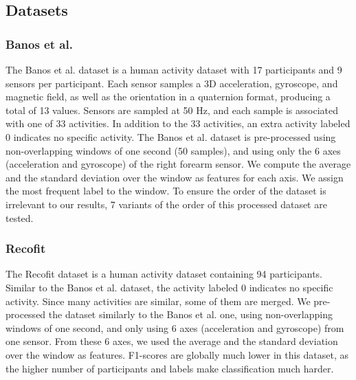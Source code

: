 \documentclass[conference]{IEEEtran}
\begin{document}
\subsection{Datasets}
\subsubsection{Banos et al.}
The Banos et al. dataset \cite{banos2012benchmark,banos2014dealing} is a human activity dataset with 17 participants and 9 sensors per participant. Each sensor samples a 3D acceleration, gyroscope, and magnetic field, as well as the orientation in a quaternion format, producing a total of 13 values. Sensors are sampled at 50 Hz, and each sample is associated with one of 33 activities. In addition to the 33 activities, an extra activity labeled 0 indicates no specific activity. The Banos et al. dataset is pre-processed using non-overlapping windows of one second (50 samples), and using only the 6 axes (acceleration and gyroscope) of the right forearm sensor. We compute the average and the standard deviation over the window as features for each axis. We assign the most frequent label to the window. To ensure the order of the dataset is irrelevant to our results, 7 variants of the order of this processed dataset are tested.
\subsubsection{Recofit}
The Recofit \cite{morris2014recofit} dataset is a human activity dataset containing 94 participants. Similar to the Banos et al. dataset, the activity labeled 0 indicates no specific activity. Since many activities are similar, some of them are merged. We pre-processed the dataset similarly to the Banos et al. one, using non-overlapping windows of one second, and only using 6 axes (acceleration and gyroscope) from one sensor. From these 6 axes, we used the average and the standard deviation over the window as features. F1-scores are globally much lower in this dataset, as the higher number of participants and labels make classification much harder.
\end{document}
